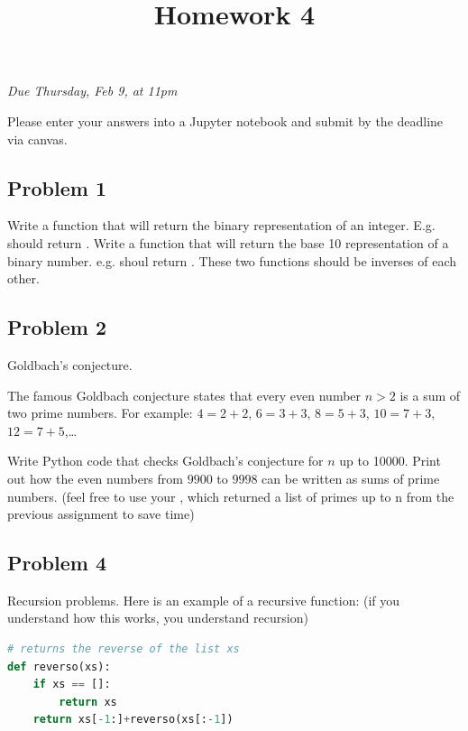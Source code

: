 \documentclass[letterpaper,11pt]{amsart}
\title{Homework 4}
\date{}
\theoremstyle{plain}
\theoremstyle{definition}
\begin{document}
\maketitle
\begin{center}
  \emph{Due Thursday, Feb 9, at 11pm}
  \vspace{0.3in}
  \end{center}


\noindent Please enter your answers into a Jupyter notebook and submit by the deadline via canvas.

\subsection*{Problem 1} Write a function  that will return the binary representation of an integer. E.g.  should return . Write a function  that will return the base 10 representation of a binary number. e.g.  shoul return . These two functions should be inverses of each other.  

\subsection*{Problem 2} Goldbach's conjecture.

The famous Goldbach conjecture states that every even number $n>2$ is a sum of two prime numbers. For example: $4 = 2 + 2$, $6 = 3 + 3$, $8 = 5 + 3$, $10 = 7 + 3$, $12 = 7 + 5$,\dots

Write Python code that checks Goldbach's conjecture for $n$ up to 10000. Print out how the even numbers from $9900$ to $9998$ can be written as sums of prime numbers. (feel free to use your , which returned a list of primes up to n from the previous assignment to save time)


\subsection*{Problem 4} Recursion problems. Here is an example of a recursive function: (if you understand how this works, you understand recursion)

\begin{lstlisting}[language=Python]
# returns the reverse of the list xs
def reverso(xs):
    if xs == []:
        return xs
    return xs[-1:]+reverso(xs[:-1])
\end{lstlisting}
\end{document}
